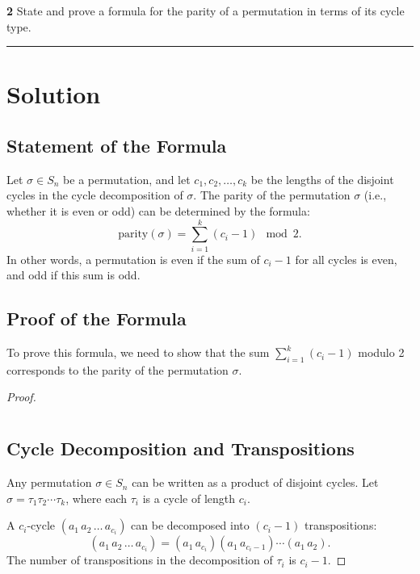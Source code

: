 \documentclass[12pt]{amsart}
\theoremstyle{definition}
\numberwithin{equation}{section}
\begin{document}
\begin{exercise}{\textbf{2}} State and prove a formula for the parity of a permutation in terms of its cycle type.

\noindent\rule{\linewidth}{1pt}

\vspace*{-10pt}\section*{Solution}

\subsection*{Statement of the Formula}
Let \(\sigma \in S_n\) be a permutation, and let \(c_1, c_2, \ldots, c_k\) be the lengths of the disjoint cycles in the cycle decomposition of \(\sigma\). The parity of the permutation \(\sigma\) (i.e., whether it is even or odd) can be determined by the formula:
\[
\text{parity}(\sigma) = \sum_{i=1}^{k} (c_i - 1) \mod 2.
\]
In other words, a permutation is even if the sum of \(c_i - 1\) for all cycles is even, and odd if this sum is odd.

\subsection*{Proof of the Formula}

To prove this formula, we need to show that the sum \(\sum_{i=1}^{k} (c_i - 1)\) modulo 2 corresponds to the parity of the permutation \(\sigma\).

\begin{proof} \(\)
    \section*{}\vspace*{-40pt}
    \subsection*{Cycle Decomposition and Transpositions}
Any permutation \(\sigma \in S_n\) can be written as a product of disjoint cycles. Let \(\sigma = \tau_1 \tau_2 \cdots \tau_k\), where each \(\tau_i\) is a cycle of length \(c_i\).

A \(c_i\)-cycle \((a_1 \, a_2 \, \ldots \, a_{c_i})\) can be decomposed into \((c_i - 1)\) transpositions:
\[
(a_1 \, a_2 \, \ldots \, a_{c_i}) = (a_1 \, a_{c_i})(a_1 \, a_{c_i-1}) \cdots (a_1 \, a_2).
\]
The number of transpositions in the decomposition of \(\tau_i\) is \(c_i - 1\).


\end{proof}
\end{exercise}
\end{document}
